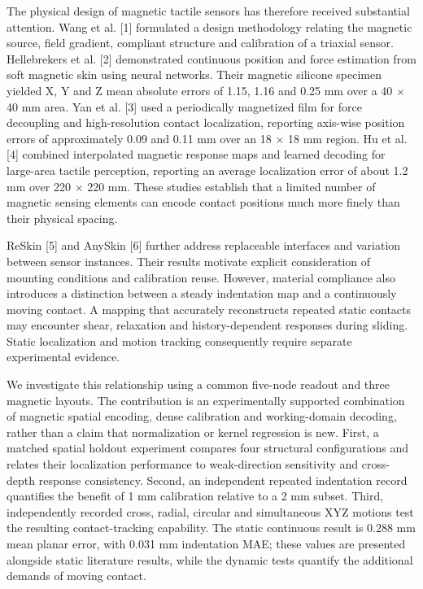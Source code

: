 \documentclass[preprint,12pt]{elsarticle}
\begin{document}
The physical design of magnetic tactile sensors has therefore received substantial attention. Wang et al. [1] formulated a design methodology relating the magnetic source, field gradient, compliant structure and calibration of a triaxial sensor. Hellebrekers et al. [2] demonstrated continuous position and force estimation from soft magnetic skin using neural networks. Their magnetic silicone specimen yielded X, Y and Z mean absolute errors of 1.15, 1.16 and 0.25 mm over a 40 \ensuremath{\times} 40 mm area. Yan et al. [3] used a periodically magnetized film for force decoupling and high-resolution contact localization, reporting axis-wise position errors of approximately 0.09 and 0.11 mm over an 18 \ensuremath{\times} 18 mm region. Hu et al. [4] combined interpolated magnetic response maps and learned decoding for large-area tactile perception, reporting an average localization error of about 1.2 mm over 220 \ensuremath{\times} 220 mm. These studies establish that a limited number of magnetic sensing elements can encode contact positions much more finely than their physical spacing.

ReSkin [5] and AnySkin [6] further address replaceable interfaces and variation between sensor instances. Their results motivate explicit consideration of mounting conditions and calibration reuse. However, material compliance also introduces a distinction between a steady indentation map and a continuously moving contact. A mapping that accurately reconstructs repeated static contacts may encounter shear, relaxation and history-dependent responses during sliding. Static localization and motion tracking consequently require separate experimental evidence.

We investigate this relationship using a common five-node readout and three magnetic layouts. The contribution is an experimentally supported combination of magnetic spatial encoding, dense calibration and working-domain decoding, rather than a claim that normalization or kernel regression is new. First, a matched spatial holdout experiment compares four structural configurations and relates their localization performance to weak-direction sensitivity and cross-depth response consistency. Second, an independent repeated indentation record quantifies the benefit of 1 mm calibration relative to a 2 mm subset. Third, independently recorded cross, radial, circular and simultaneous XYZ motions test the resulting contact-tracking capability. The static continuous result is 0.288 mm mean planar error, with 0.031 mm indentation MAE; these values are presented alongside static literature results, while the dynamic tests quantify the additional demands of moving contact.
\end{document}
